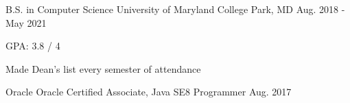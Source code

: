 

\begin{cventries}

  \cventry
    {B.S. in Computer Science} %
    {University of Maryland} %
    {College Park, MD} %
    {Aug. 2018 - May 2021} %
    {
      \begin{cvitems} %
        \item {GPA: 3.8 / 4}
        \item {Made Dean's list every semester of attendance}
      \end{cvitems}
    }

    \cventry
    {Oracle} %
    {Oracle Certified Associate, Java SE8 Programmer} %
    {} %
    {Aug. 2017} %
    {
      \begin{cvitems} %
      \end{cvitems}
    }



\end{cventries}
